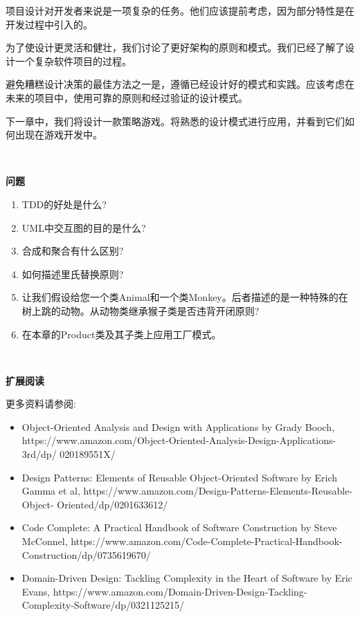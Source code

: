 项目设计对开发者来说是一项复杂的任务。他们应该提前考虑，因为部分特性是在开发过程中引入的。 \par
为了使设计更灵活和健壮，我们讨论了更好架构的原则和模式。我们已经了解了设计一个复杂软件项目的过程。 \par
避免糟糕设计决策的最佳方法之一是，遵循已经设计好的模式和实践。应该考虑在未来的项目中，使用可靠的原则和经过验证的设计模式。 \par
下一章中，我们将设计一款策略游戏。将熟悉的设计模式进行应用，并看到它们如何出现在游戏开发中。 \par

\noindent\textbf{}\ \par
\textbf{问题} \ \par
\begin{enumerate}
	\item TDD的好处是什么?
	\item UML中交互图的目的是什么?
	\item 合成和聚合有什么区别?
	\item 如何描述里氏替换原则?
	\item 让我们假设给您一个类Animal和一个类Monkey。后者描述的是一种特殊的在树上跳的动物。从动物类继承猴子类是否违背开闭原则?
	\item 在本章的Product类及其子类上应用工厂模式。
\end{enumerate}

\noindent\textbf{}\ \par
\textbf{扩展阅读} \ \par
更多资料请参阅: \par
\begin{itemize}
	\item Object-Oriented Analysis and Design with Applications by Grady Booch,  https:/​/www.​amazon.​com/​Object-​Oriented-​Analysis-​Design-​Applications-​3rd/​dp/	020189551X/​
	\item Design Patterns: Elements of Reusable Object-Oriented Software by Erich Gamma et	al, https:/​/​www.​amazon.​com/​Design-​Patterns-​Elements-​Reusable-​Object-	Oriented/​dp/​0201633612/​
	\item Code Complete: A Practical Handbook of Software Construction by Steve McConnel, https://www.amazon.com/Code-Complete-Practical-Handbook-Construction/dp/0735619670/
	\item Domain-Driven Design: Tackling Complexity in the Heart of Software by Eric	Evans,  https:/​/​www.​amazon.​com/​Domain-​Driven-​Design-​Tackling-
	Complexity-​Software/​dp/​0321125215/
\end{itemize}

\newpage










